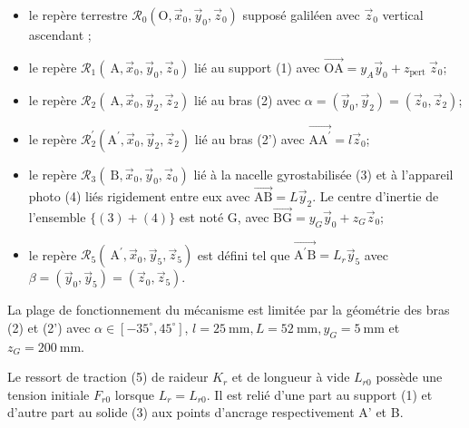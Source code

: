 \begin{itemize}
  \item le repère terrestre $\mathcal{R}_{0}\left(\mathrm{O}, \vec{x}_{0}, \vec{y}_{0}, \vec{z}_{0}\right)$ supposé galiléen avec $\vec{z}_{0}$ vertical ascendant ;

  \item le repère $\mathcal{R}_{1}\left(\mathrm{~A}, \vec{x}_{0}, \vec{y}_{0}, \vec{z}_{0}\right)$ lié au support (1) avec $\overrightarrow{\mathrm{OA}}=y_{A} \vec{y}_{0}+z_{\text {pert }} \vec{z}_{0}$;

  \item le repère $\mathcal{R}_{2}\left(\mathrm{~A}, \vec{x}_{0}, \vec{y}_{2}, \vec{z}_{2}\right)$ lié au bras (2) avec $\alpha=\left(\vec{y}_{0}, \vec{y}_{2}\right)=\left(\vec{z}_{0}, \vec{z}_{2}\right)$;

  \item le repère $\mathcal{R}_{2}^{\prime}\left(\mathrm{A}^{\prime}, \vec{x}_{0}, \vec{y}_{2}, \vec{z}_{2}\right)$ lié au bras (2') avec $\overrightarrow{\mathrm{AA}^{\prime}}=l \vec{z}_{0}$;

  \item le repère $\mathcal{R}_{3}\left(\mathrm{~B}, \vec{x}_{0}, \vec{y}_{0}, \vec{z}_{0}\right)$ lié à la nacelle gyrostabilisée (3) et à l'appareil photo (4) liés rigidement entre eux avec $\overrightarrow{\mathrm{AB}}=L \vec{y}_{2}$. Le centre d'inertie de l'ensemble $\{(3)+(4)\}$ est noté $\mathrm{G}$, avec $\overrightarrow{\mathrm{BG}}=y_{G} \vec{y}_{0}+z_{G} \vec{z}_{0} ;$

  \item le repère $\mathcal{R}_{5}\left(\mathrm{~A}^{\prime}, \vec{x}_{0}, \vec{y}_{5}, \vec{z}_{5}\right)$ est défini tel que $\overrightarrow{\mathrm{A}^{\prime} \mathrm{B}}=L_{r} \vec{y}_{5}$ avec $\beta=\left(\vec{y}_{0}, \vec{y}_{5}\right)=\left(\vec{z}_{0}, \vec{z}_{5}\right)$.

\end{itemize}

La plage de fonctionnement du mécanisme est limitée par la géométrie des bras (2) et (2') avec $\alpha \in\left[-35^{\circ}, 45^{\circ}\right]$, $l=25 \mathrm{~mm}, L=52 \mathrm{~mm}, y_{G}=5 \mathrm{~mm}$ et $z_{G}=200 \mathrm{~mm}$.

Le ressort de traction (5) de raideur $K_{r}$ et de longueur à vide $L_{r 0}$ possède une tension initiale $F_{r 0}$ lorsque $L_{r}=L_{r 0}$. Il est relié d'une part au support (1) et d'autre part au solide (3) aux points d'ancrage respectivement A' et B.

